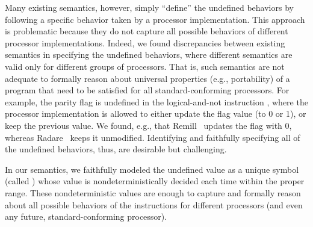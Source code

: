 Many existing semantics, however, simply ``define'' the undefined behaviors by
following a specific behavior taken by a processor implementation.
This approach is problematic because they do not capture all possible behaviors of different processor implementations.
Indeed, we found discrepancies between existing semantics in specifying the undefined behaviors, where different semantics are valid only for different groups of processors.
That is, such semantics are not adequate to formally reason about universal properties (e.g., portability) of a program that need to be satisfied for all standard-conforming processors.
%
For example, the parity flag  is undefined in the logical-and-not instruction , where the processor implementation is allowed to either update the flag value (to 0 or 1), or keep the previous value.
We found, e.g., that Remill~\cite{Remill} updates the flag with 0, whereas Radare~\cite{Radare2} keeps it unmodified.
%
Identifying and faithfully specifying all of the undefined behaviors, thus, are desirable but challenging.

In our semantics, we faithfully modeled the undefined value as a unique symbol (called ) whose value is nondeterministically decided each time within the proper range.
These nondeterministic values are enough to capture and formally reason about all possible behaviors of the instructions for different processors (and even any future, standard-conforming processor).






%









